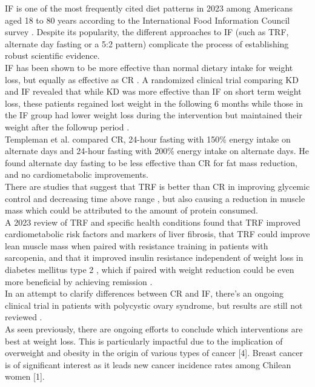 \documentclass[journal,article,submit,pdftex,moreauthors]{Definitions/mdpi}
\begin{document}
{IF is one of the most frequently cited diet patterns in 2023 among Americans aged 18 to 80 years according to the International Food Information Council survey \cite{international2023}. Despite its popularity, the different approaches to IF (such as TRF, alternate day fasting or a 5:2 pattern) complicate the process of establishing robust scientific evidence. \\

IF has been shown to be more effective than normal dietary intake for weight loss, but equally as effective as CR \cite{lange2023metabolic}. A randomized clinical trial comparing KD and IF revealed that while KD was more effective than IF on short term weight loss, these patients regained lost weight in the following 6 months while those in the IF group had lower weight loss during the intervention but maintained their weight after the followup period \cite{zhangcomparing}.\\

Templeman et al. \cite{templeman2021randomized} compared CR, 24-hour fasting with 150\% energy intake on alternate days and 24-hour fasting with 200\% energy intake on alternate days. He found alternate day fasting to be less effective than CR for fat mass reduction, and no cardiometabolic improvements.\\

There are studies that suggest that TRF is better than CR in improving glycemic control \cite{ferri2023time} and decreasing time above range \cite{nasserifar2023thu272}, but also causing a reduction in muscle mass \cite{ferri2023time} which could be attributed to the amount of protein consumed.\\

A 2023 review of TRF and specific health conditions found that TRF improved cardiometabolic risk factors and markers of liver fibrosis, that TRF could improve lean muscle mass when paired with resistance training in patients with sarcopenia, and that it improved insulin resistance independent of weight loss in diabetes mellitus type 2 \cite{mishra2023time}, which if paired with weight reduction could be even more beneficial by achieving remission \cite{dambha2020behaviour}.\\

In an attempt to clarify differences between CR and IF, there’s an ongoing clinical trial in patients with polycystic ovary syndrome, but results are still not reviewed \cite{talebi2023effects}.\\


{\color{red}As seen previously, there are ongoing efforts to conclude which interventions are best at weight loss. This is  particularly impactful due to the implication of overweight and obesity in the origin of various types of cancer [4]. Breast cancer is of significant interest as it leads new cancer incidence rates among Chilean women [1].}
}
\\
\end{document}
